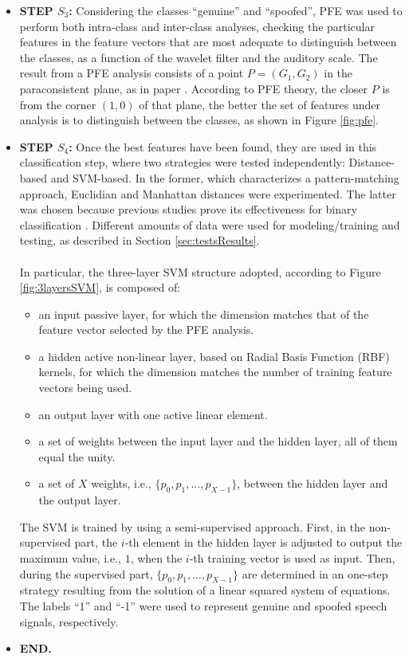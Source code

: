 \begin{itemize}
\item{}\textbf{STEP $S_3$: }Considering the classes ``genuine'' and ``spoofed'', PFE was used to perform both intra-class and inter-class analyses, checking the particular features in the feature vectors that are most adequate to distinguish between the classes, as a function of the wavelet filter and the auditory scale. The result from a PFE analysis consists of a point $P=(G_1,G_2)$ in the paraconsistent plane, as in paper \cite{8588433}. According to PFE theory, the closer $P$ is from the corner $(1,0)$ of that plane, the better the set of features under analysis is to distinguish between the classes, as shown in Figure \ref{fig:pfe}. 
\item{}\textbf{STEP $S_4$: }Once the best features have been found, they are used in this classification step, where two strategies were tested independently: Distance-based and SVM-based. In the former, which characterizes a pattern-matching approach, Euclidian and Manhattan distances were experimented. The latter was chosen because previous studies prove its effectiveness for binary classification \cite{bennett2000support}. Different amounts of data were used for modeling/training and testing, as described in Section \ref{sec:testsResults}.
\\
\\
In particular, the three-layer SVM structure adopted, according to Figure \ref{fig:3layersSVM}, is composed of:
	\begin{itemize}
	\item{}an input passive layer, for which the dimension matches that of the feature vector selected by the PFE analysis.
	\item{}a hidden active non-linear layer, based on Radial Basis Function (RBF) kernels, for which the dimension matches the number of training feature vectors being used. 
	\item{}an output layer with one active linear element. 
    \item{}a set of weights between the input layer and the hidden layer, all of them equal the unity. 
    \item{}a set of $X$ weights, i.e., $\{p_0, p_1, ..., p_{X-1}\}$, between the hidden layer and the output layer.
    \end{itemize}
The SVM is trained by using a semi-supervised approach. First, in the non-supervised part, the $i$-th element in the hidden layer is adjusted to output the maximum value, i.e., $1$, when the $i$-th training vector is used as input. Then, during the supervised part, $\{p_0, p_1, ..., p_{X-1}\}$ are determined in an one-step strategy resulting from the solution of a linear squared system of equations\cite{poole2014linear}. The labels ``1'' and ``-1'' were used to represent genuine and spoofed speech signals, respectively.  
\item{}\textbf{END.}
\end{itemize}
